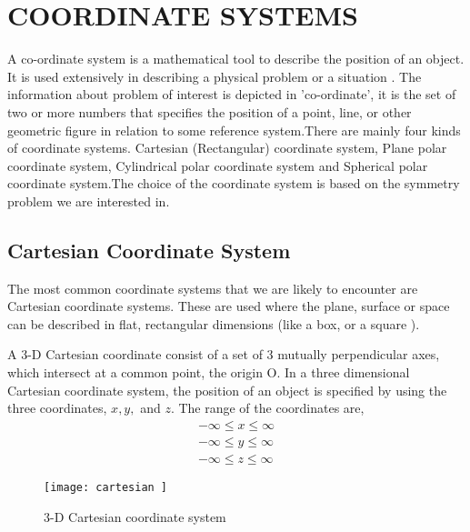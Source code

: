 \chapter{COORDINATE SYSTEMS}
A co-ordinate system is a mathematical tool to describe the position of an object. It  is used extensively in describing a physical problem or a situation . The information about problem of interest is depicted in 'co-ordinate', it is the set of two or more numbers that specifies the position of a point, line, or other geometric figure in relation to some reference system.\newline There are mainly four kinds of coordinate systems. Cartesian (Rectangular) coordinate system, Plane polar coordinate system, Cylindrical polar coordinate system and Spherical polar coordinate system.The choice of the coordinate system is based on the symmetry problem we are interested in.
\section{Cartesian Coordinate System}
The most common coordinate systems that we are likely to encounter are Cartesian coordinate systems. These are used where the plane, surface or space can be described in flat, rectangular dimensions (like a box, or a square ).
\\
\begin{minipage}{0.50\textwidth}
	A 3-D Cartesian coordinate consist of a set of 3 mutually perpendicular axes, which intersect at a common point, the origin O. In a three dimensional Cartesian coordinate system, the position of an object is specified by using the three coordinates, ${x}, {y},$ and ${z}$. The range of the coordinates are,
	\begin{align*}
	-\infty \leqslant x \leqslant \infty \\
	-\infty \leqslant y \leqslant \infty \\
	-\infty \leqslant z \leqslant \infty
	\end{align*}
\end{minipage}\hfill
\begin{minipage}{0.35\textwidth}
	\begin{figure}[H]
		\begin{center}
			\texttt{[image: cartesian ]}
		\end{center}
		\caption{3-D Cartesian coordinate system}
	\end{figure}
\end{minipage}
